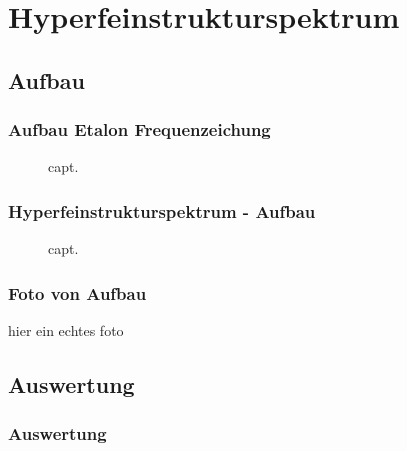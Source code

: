 
\section{Hyperfeinstrukturspektrum}
\subsection{Aufbau}


\begin{frame}
\frametitle{Aufbau Etalon Frequenzeichung}

\begin{figure}
    \centering
    \def\svgwidth{\textwidth}
    
    \caption{capt.}
\end{figure}

\end{frame}




\begin{frame}
\frametitle{Hyperfeinstrukturspektrum - Aufbau}

\begin{figure}
    \centering
    \def\svgwidth{\textwidth}
    
    \caption{capt.}
\end{figure}

\end{frame}



\begin{frame}
\frametitle{Foto von Aufbau}

hier ein echtes foto

\end{frame}



\subsection{Auswertung}
\begin{frame}
\frametitle{Auswertung}
  
\end{frame}